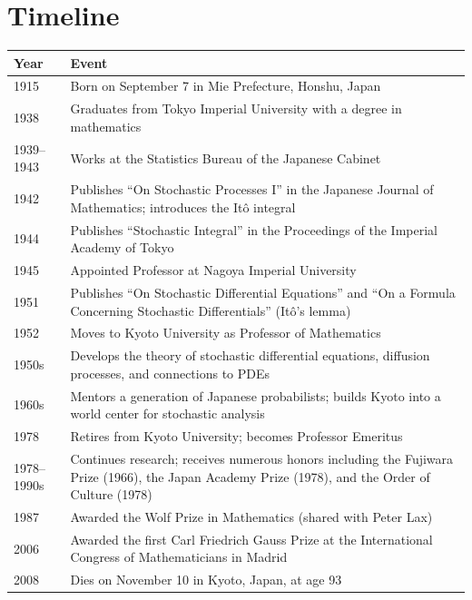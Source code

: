 \section*{Timeline}
\begin{tabularx}{\linewidth}{|p{1.5cm}|>{\raggedright\arraybackslash}X|}
\hline
\textbf{Year} & \textbf{Event} \\ \hline
1915 & Born on September 7 in Mie Prefecture, Honshu, Japan \\ \hline
1938 & Graduates from Tokyo Imperial University with a degree in mathematics \\ \hline
1939--1943 & Works at the Statistics Bureau of the Japanese Cabinet \\ \hline
1942 & Publishes ``On Stochastic Processes I'' in the Japanese Journal of Mathematics; introduces the It\^{o} integral \\ \hline
1944 & Publishes ``Stochastic Integral'' in the Proceedings of the Imperial Academy of Tokyo \\ \hline
1945 & Appointed Professor at Nagoya Imperial University \\ \hline
1951 & Publishes ``On Stochastic Differential Equations'' and ``On a Formula Concerning Stochastic Differentials'' (It\^{o}'s lemma) \\ \hline
1952 & Moves to Kyoto University as Professor of Mathematics \\ \hline
1950s & Develops the theory of stochastic differential equations, diffusion processes, and connections to PDEs \\ \hline
1960s & Mentors a generation of Japanese probabilists; builds Kyoto into a world center for stochastic analysis \\ \hline
1978 & Retires from Kyoto University; becomes Professor Emeritus \\ \hline
1978--1990s & Continues research; receives numerous honors including the Fujiwara Prize (1966), the Japan Academy Prize (1978), and the Order of Culture (1978) \\ \hline
1987 & Awarded the Wolf Prize in Mathematics (shared with Peter Lax) \\ \hline
2006 & Awarded the first Carl Friedrich Gauss Prize at the International Congress of Mathematicians in Madrid \\ \hline
2008 & Dies on November 10 in Kyoto, Japan, at age 93 \\ \hline
\end{tabularx}

